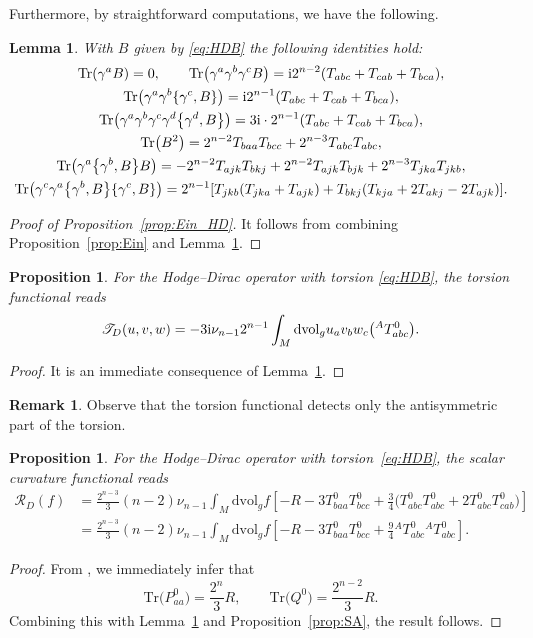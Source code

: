 \documentclass[pdftex]{sigma}
\numberwithin{equation}{section}
\newtheorem{Lemma}[Theorem]{Lemma}
\newtheorem{Proposition}[Theorem]{Proposition}
\theoremstyle{definition}
\newtheorem{Remark}[Theorem]{Remark}
\def\Tr{\mathrm{Tr}}
\def\dv{\mathrm{dvol}_g}
\begin{document}
Furthermore, by straightforward computations, we have the following.
\begin{Lemma}
	\label{lemma:TRB}
	With $B$ given by \eqref{eq:HDB} the following identities hold:
	\begin{gather*}
			 \Tr(\gamma^aB)=0, \qquad
			 \Tr\bigl(\gamma^a\gamma^b\gamma^cB\bigr)={\rm i} 2^{n-2}(T_{abc}+T_{cab}+T_{bca}),\\
			\Tr\bigl(\gamma^a\gamma^b\{\gamma^c,B\}\bigr)={\rm i} 2^{n-1}(T_{abc}+T_{cab}+T_{bca}),\\
			 \Tr\bigl(\gamma^a\gamma^b\gamma^c\gamma^d\bigl\{\gamma^d,B\bigr\}\bigr)=3{\rm i}\cdot 2^{n-1} (T_{abc}+T_{cab}+T_{bca}),\\
			 \Tr\bigl(B^2\bigr)=2^{n-2}T_{baa}T_{bcc}+2^{n-3}T_{abc}T_{abc},\\
			 \Tr\bigl(\gamma^a\bigl\{\gamma^b,B\bigr\}B\bigr)=
			-2^{n-2}T_{ajk}T_{bkj}+2^{n-2}T_{ajk}T_{bjk}+2^{n-3}T_{jka}T_{jkb}, \\
			\Tr\bigl(\gamma^c\gamma^a\bigl\{\gamma^b,B\bigr\}\{\gamma^c,B\}\bigr)=2^{n-1}[T_{jkb}(T_{jka}+T_{ajk})+T_{bkj}(T_{kja}+2T_{akj}-2T_{ajk})].	
	\end{gather*}
\end{Lemma}
\begin{proof}[Proof of Proposition~\ref{prop:Ein_HD}]
It follows from combining Proposition~\ref{prop:Ein} and Lemma~\ref{lemma:TRB}.
\end{proof}

\begin{Proposition}
 For the Hodge--Dirac operator with torsion \eqref{eq:HDB}, the torsion functional reads
 \[
 \mathscr{T}_D(u,v,w)= - 3 {\rm i}\nu_{n-1}2^{n-1}\int_M \dv u_{a}v_bw_c \bigl({}^AT^{0}_{abc}\bigr).
 \]
\end{Proposition}
\begin{proof}
 It is an immediate consequence of Lemma~\ref{lemma:TRB}.
\end{proof}

\begin{Remark}
Observe that the torsion functional detects only the antisymmetric part of the torsion.
\end{Remark}
\begin{Proposition}
 \label{prop:HD_SA}
 For the Hodge--Dirac operator with torsion~\eqref{eq:HDB}, the scalar curvature functional reads
 \begin{align*}
 \mathscr{R}_D(f)&=\frac{2^{n-3}}{3}(n-2)\nu_{n-1}\int_M \dv f\left[-R-3T^0_{baa} T^0_{bcc}
 +\frac{3}{4}\bigl(T^0_{abc}T^0_{abc}+2T^0_{abc}T^0_{cab}\bigr)\right]\\
 &=\frac{2^{n-3}}{3}(n-2)\nu_{n-1}\int_M \dv f\left[-R-3T^0_{baa}T^0_{bcc}+\frac{9}{4}{}^A T^{0}_{abc} {}^A T^{0}_{abc}\right].
 \end{align*}
\end{Proposition}
\begin{proof}
 From \cite[Lemma~2.1]{dabrowski2024a}, we immediately infer that
 \[
 \Tr\bigl(P^0_{aa}\bigr)=\frac{2^n}{3}R, \qquad \Tr\bigl(Q^0\bigr)=\frac{2^{n-2}}{3}R.
 \]
 Combining this with Lemma~\ref{lemma:TRB} and Proposition~\ref{prop:SA}, the result follows.
\end{proof}
\end{document}
